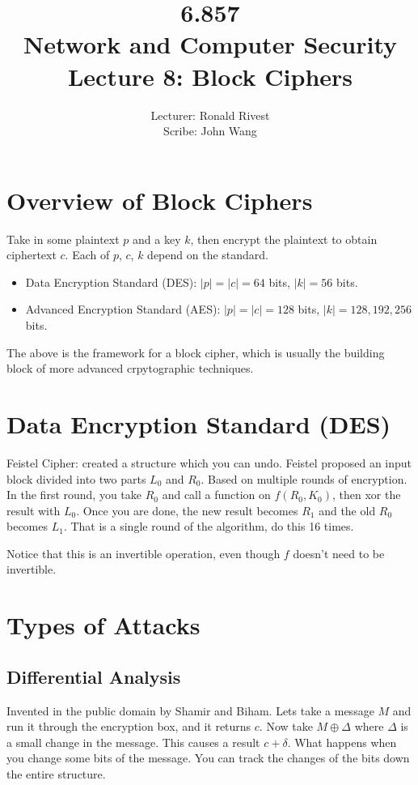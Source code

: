 \documentclass[psamsfonts]{amsart}
\title{6.857 \\
Network and Computer Security \\
Lecture 8: Block Ciphers}
\author{Lecturer: Ronald Rivest\\
Scribe: John Wang}
\begin{document}
\maketitle

\section{Overview of Block Ciphers}

Take in some plaintext $p$ and a key $k$, then encrypt the plaintext to obtain ciphertext $c$. Each of $p$, $c$, $k$ depend on the standard.

\begin{itemize}
  \item Data Encryption Standard (DES): $|p| = |c| = 64$ bits, $|k| = 56$ bits.
  \item Advanced Encryption Standard (AES): $|p| = |c| = 128$ bits, $|k| = 128, 192, 256$ bits.
\end{itemize}

The above is the framework for a block cipher, which is usually the building block of more advanced crpytographic techniques.

\section{Data Encryption Standard (DES)}

Feistel Cipher: created a structure which you can undo. Feistel proposed an input block divided into two parts $L_0$ and $R_0$. Based on multiple rounds of encryption. In the first round, you take $R_0$ and call a function on $f(R_0, K_0)$, then xor the result with $L_0$. Once you are done, the new result becomes $R_1$ and the old $R_0$ becomes $L_1$. That is a single round of the algorithm, do this 16 times.

Notice that this is an invertible operation, even though $f$ doesn't need to be invertible.

\section{Types of Attacks}

\subsection{Differential Analysis}

Invented in the public domain by Shamir and Biham. Lets take a message $M$ and run it through the encryption box, and it returns $c$. Now take $M \oplus \Delta$ where $\Delta$ is a small change in the message. This causes a result $c + \delta$. What happens when you change some bits of the message. You can track the changes of the bits down the entire structure.
\end{document}
